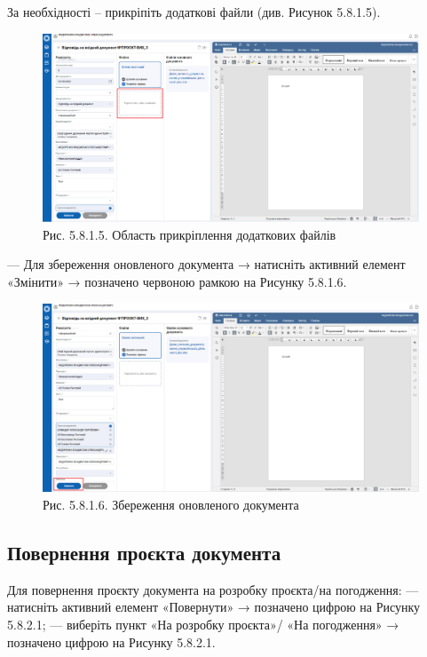За необхідності – прикріпіть додаткові файли (див. Рисунок 5.8.1.5).

\begin{figure}[!htbp]
\centerline{\includegraphics[width=\textwidth]{img/5.8.1.5.png}}
\caption{Рис. 5.8.1.5. Область прикріплення додаткових файлів}
\end{figure}

--- Для збереження оновленого документа → натисніть активний елемент
«Змінити» → позначено червоною рамкою на Рисунку 5.8.1.6.

\begin{figure}[!htbp]
\centerline{\includegraphics[width=\textwidth]{img/5.8.1.6.png}}
\caption{Рис. 5.8.1.6. Збереження оновленого документа}
\end{figure}

\subsection{Повернення проєкта документа}

Для повернення проєкту документа на розробку проєкта/на погодження:
--- натисніть активний елемент «Повернути» → позначено цифрою  на Рисунку 5.8.2.1;
--- виберіть пункт «На розробку проєкта»/ «На погодження» → позначено цифрою  на Рисунку 5.8.2.1.

